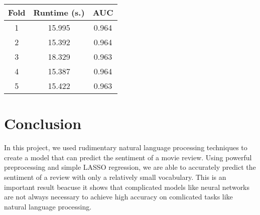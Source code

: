 \documentclass{article}
\begin{document}
\begin{center}
    \begin{tabular}{|c|c|c|}
        \hline
        Fold & Runtime (s.) & AUC \\ 
        \hline \hline 
        1 & 15.995 & 0.964 \\ 
        \hline
        2 & 15.392 & 0.964 \\ 
        \hline
        3 & 18.329 & 0.963 \\ 
        \hline
        4 & 15.387 & 0.964 \\ 
        \hline
        5 & 15.422 & 0.963 \\ 
        \hline
    \end{tabular}
\end{center}

\section{Conclusion}

In this project, we used rudimentary natural language processing techniques to create a model that can predict the sentiment of a movie review. Using powerful preprocessing and simple LASSO regression, we are able to accurately predict the sentiment of a review with only a relatively small vocabulary. This is an important result beacuse it shows that complicated models like neural networks are not always necessary to achieve high accuracy on comlicated tasks like natural language processing. 
\end{document}

